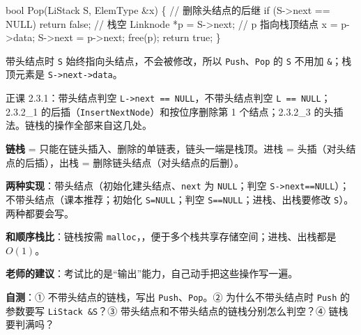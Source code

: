 \documentclass[10.5pt,a4paper,oneside]{article}
\newcommand{\uln}[1]{\CJKunderline[format=\color{wdred},thickness=0.9pt,depth=0.28em]{#1}}
\newenvironment{Shaded}{}{}
\newcommand{\CommentTok}[1]{\textcolor[rgb]{0.18,0.55,0.23}{#1}}
\newcommand{\ControlFlowTok}[1]{\textcolor[rgb]{0.12,0.31,0.71}{#1}}
\newcommand{\DataTypeTok}[1]{\textcolor[rgb]{0.12,0.31,0.71}{#1}}
\newcommand{\KeywordTok}[1]{\textcolor[rgb]{0.12,0.31,0.71}{#1}}
\newcommand{\NormalTok}[1]{#1}
\newcommand{\OperatorTok}[1]{\textcolor[rgb]{0.20,0.20,0.20}{#1}}
\begin{document}
\begin{Shaded}
\begin{Highlighting}[]
\DataTypeTok{bool}\NormalTok{ Pop}\OperatorTok{(}\NormalTok{LiStack S}\OperatorTok{,}\NormalTok{ ElemType }\OperatorTok{\&}\NormalTok{x}\OperatorTok{)} \OperatorTok{\{}  \CommentTok{// 删除头结点的后继}
    \ControlFlowTok{if} \OperatorTok{(}\NormalTok{S}\OperatorTok{{-}\textgreater{}}\NormalTok{next }\OperatorTok{==}\NormalTok{ NULL}\OperatorTok{)} \ControlFlowTok{return} \KeywordTok{false}\OperatorTok{;}          \CommentTok{// 栈空}
\NormalTok{    Linknode }\OperatorTok{*}\NormalTok{p }\OperatorTok{=}\NormalTok{ S}\OperatorTok{{-}\textgreater{}}\NormalTok{next}\OperatorTok{;}          \CommentTok{// p 指向栈顶结点}
\NormalTok{    x }\OperatorTok{=}\NormalTok{ p}\OperatorTok{{-}\textgreater{}}\NormalTok{data}\OperatorTok{;}
\NormalTok{    S}\OperatorTok{{-}\textgreater{}}\NormalTok{next }\OperatorTok{=}\NormalTok{ p}\OperatorTok{{-}\textgreater{}}\NormalTok{next}\OperatorTok{;}
\NormalTok{    free}\OperatorTok{(}\NormalTok{p}\OperatorTok{);}
    \ControlFlowTok{return} \KeywordTok{true}\OperatorTok{;}
\OperatorTok{\}}
\end{Highlighting}
\end{Shaded}

带头结点时 \texttt{S} 始终指向头结点，不会被修改，所以
\texttt{Push}、\texttt{Pop} 的 \texttt{S} 不用加 \texttt{\&}；栈顶元素是
\texttt{S-\textgreater{}next-\textgreater{}data}。

\begin{recallbox}

正课 2.3.1：带头结点判空
\texttt{L-\textgreater{}next\ ==\ NULL}，不带头结点判空
\texttt{L\ ==\ NULL}；2.3.2\_1
的后插（\texttt{InsertNextNode}）和按位序删除第 1 个结点；2.3.2\_3
的头插法。链栈的操作全部来自这几处。

\end{recallbox}

\begin{summarybox}

\textbf{链栈} = 只能在链头插入、删除的单链表，链头一端是栈顶。进栈 =
头插（对头结点的后插），出栈 = 删除链头结点（对头结点的后删）。

\textbf{两种实现}：带头结点（初始化建头结点、\texttt{next} 为
\texttt{NULL}；判空
\texttt{S-\textgreater{}next==NULL}）；不带头结点（课本推荐；初始化
\texttt{S=NULL}；判空 \texttt{S==NULL}；进栈、出栈要修改
\texttt{S}）。两种都要会写。

\textbf{和顺序栈比}：链栈按需
\texttt{malloc}，\uln{不会栈满上溢}，便于多个栈共享存储空间；进栈、出栈都是
\(O(1)\)。

\textbf{老师的建议}：考试比的是“输出”能力，自己动手把这些操作写一遍。

\textbf{自测}：① 不带头结点的链栈，写出 \texttt{Push}、\texttt{Pop}。②
为什么不带头结点时 \texttt{Push} 的参数要写 \texttt{LiStack\ \&S}？③
带头结点和不带头结点的链栈分别怎么判空？④ 链栈要判满吗？

\end{summarybox}
\end{document}
